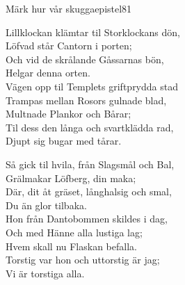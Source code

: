 \begin{song}{Märk hur vår skugga}{epistel81}
\begin{vers}
Lillklockan klämtar til Storklockans dön,\\
Löfvad står Cantorn i porten;\\
Och vid de skrålande Gåssarnas bön,\\
Helgar denna orten.\\
Vägen opp til Templets griftprydda stad\\
Trampas mellan Rosors gulnade blad,\\
Multnade Plankor och Bårar;\\
Til dess den långa och svartklädda rad,\\
Djupt sig bugar med tårar.\\
\end{vers}
\begin{vers}
Så gick til hvila, från Slagsmål och Bal,\\
Grälmakar Löfberg, din maka; \\
Där, dit åt gräset, långhalsig och smal,\\
Du än glor tilbaka.\\
Hon från Dantobommen skildes i dag,\\
Och med Hänne alla lustiga lag;\\
Hvem skall nu Flaskan befalla.\\
Torstig var hon och uttorstig är jag;\\
Vi är torstiga alla.\\
\end{vers}
\end{song}
